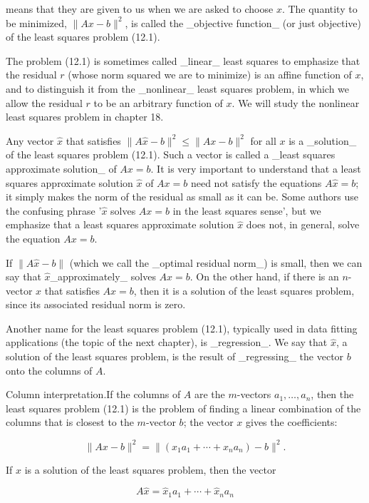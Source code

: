 means that they are given to us when we are asked to choose \(x\). The quantity to be minimized, \(\|Ax-b\|^{2}\), is called the _objective function_ (or just objective) of the least squares problem (12.1).

The problem (12.1) is sometimes called _linear_ least squares to emphasize that the residual \(r\) (whose norm squared we are to minimize) is an affine function of \(x\), and to distinguish it from the _nonlinear_ least squares problem, in which we allow the residual \(r\) to be an arbitrary function of \(x\). We will study the nonlinear least squares problem in chapter 18.

Any vector \(\hat{x}\) that satisfies \(\|A\hat{x}-b\|^{2}\leq\|Ax-b\|^{2}\) for all \(x\) is a _solution_ of the least squares problem (12.1). Such a vector is called a _least squares approximate solution_ of \(Ax=b\). It is very important to understand that a least squares approximate solution \(\hat{x}\) of \(Ax=b\) need not satisfy the equations \(A\hat{x}=b\); it simply makes the norm of the residual as small as it can be. Some authors use the confusing phrase '\(\hat{x}\) solves \(Ax=b\) in the least squares sense', but we emphasize that a least squares approximate solution \(\hat{x}\) does not, in general, solve the equation \(Ax=b\).

If \(\|A\hat{x}-b\|\) (which we call the _optimal residual norm_) is small, then we can say that \(\hat{x}\)_approximately_ solves \(Ax=b\). On the other hand, if there is an \(n\)-vector \(x\) that satisfies \(Ax=b\), then it is a solution of the least squares problem, since its associated residual norm is zero.

Another name for the least squares problem (12.1), typically used in data fitting applications (the topic of the next chapter), is _regression_. We say that \(\hat{x}\), a solution of the least squares problem, is the result of _regressing_ the vector \(b\) onto the columns of \(A\).

Column interpretation.If the columns of \(A\) are the \(m\)-vectors \(a_{1},\ldots,a_{n}\), then the least squares problem (12.1) is the problem of finding a linear combination of the columns that is closest to the \(m\)-vector \(b\); the vector \(x\) gives the coefficients:

\[\|Ax-b\|^{2}=\|(x_{1}a_{1}+\cdots+x_{n}a_{n})-b\|^{2}.\]

If \(\hat{x}\) is a solution of the least squares problem, then the vector

\[A\hat{x}=\hat{x}_{1}a_{1}+\cdots+\hat{x}_{n}a_{n}\]

